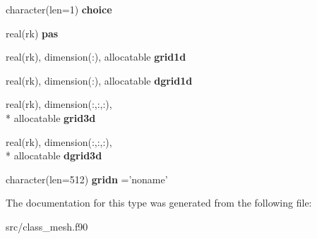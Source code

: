 \begin{DoxyCompactItemize}
\item 
\hypertarget{structclass__mesh_1_1mesh__grid_ab7f0b957d38dd1682f2a7e3015692b40}{character(len=1) {\bfseries choice}}\label{structclass__mesh_1_1mesh__grid_ab7f0b957d38dd1682f2a7e3015692b40}

\item 
\hypertarget{structclass__mesh_1_1mesh__grid_ad57b797415bbdf287f99603d8f356d94}{real(rk) {\bfseries pas}}\label{structclass__mesh_1_1mesh__grid_ad57b797415bbdf287f99603d8f356d94}

\item 
\hypertarget{structclass__mesh_1_1mesh__grid_ae45d22b0ad33655b5f2e132ba1e2e456}{real(rk), dimension(\-:), allocatable {\bfseries grid1d}}\label{structclass__mesh_1_1mesh__grid_ae45d22b0ad33655b5f2e132ba1e2e456}

\item 
\hypertarget{structclass__mesh_1_1mesh__grid_af891a40b479f751bd473aadb55c8da5f}{real(rk), dimension(\-:), allocatable {\bfseries dgrid1d}}\label{structclass__mesh_1_1mesh__grid_af891a40b479f751bd473aadb55c8da5f}

\item 
\hypertarget{structclass__mesh_1_1mesh__grid_a26b37481f568a525946cf24e4952262b}{real(rk), dimension(\-:,\-:,\-:), \\*
allocatable {\bfseries grid3d}}\label{structclass__mesh_1_1mesh__grid_a26b37481f568a525946cf24e4952262b}

\item 
\hypertarget{structclass__mesh_1_1mesh__grid_a205101b7791746b84bcca2ec61dd5002}{real(rk), dimension(\-:,\-:,\-:), \\*
allocatable {\bfseries dgrid3d}}\label{structclass__mesh_1_1mesh__grid_a205101b7791746b84bcca2ec61dd5002}

\item 
\hypertarget{structclass__mesh_1_1mesh__grid_ac60933a854daec3ec32546c4107c8fba}{character(len=512) {\bfseries gridn} ='noname'}\label{structclass__mesh_1_1mesh__grid_ac60933a854daec3ec32546c4107c8fba}

\end{DoxyCompactItemize}


The documentation for this type was generated from the following file\-:\begin{DoxyCompactItemize}
\item 
src/class\-\_\-mesh.\-f90\end{DoxyCompactItemize}
